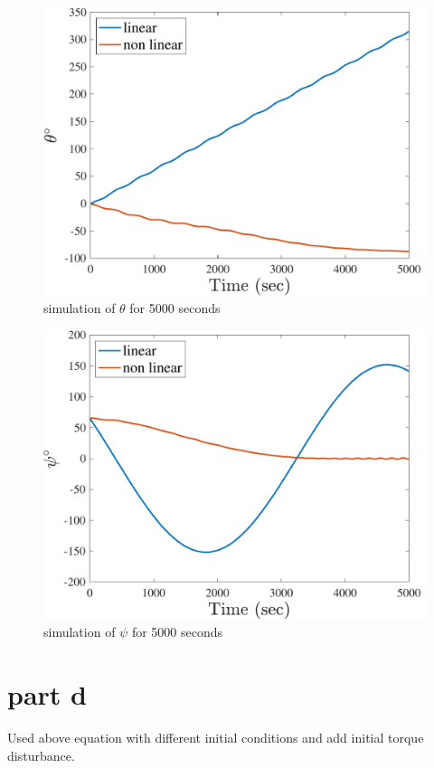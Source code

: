 \begin{figure}[H]
    \caption{simulation of $\theta$ for 5000 seconds}
    \centering
    \includegraphics[width=12cm]{../Figure/Q2/theta_5000}
\end{figure}

\begin{figure}[H]
    \caption{simulation of $\psi$ for 5000 seconds}
    \centering
    \includegraphics[width=12cm]{../Figure/Q2/psi_5000}
\end{figure}

\section{part d}

Used above equation with different initial conditions and add initial torque disturbance.

